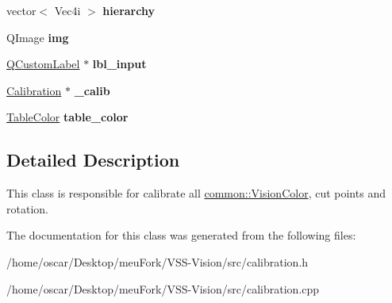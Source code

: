 \begin{DoxyCompactItemize}
\item 
\hypertarget{classcalibration_a818940843ae109ee2e7bd3cb202c4704}{vector$<$ Vec4i $>$ {\bfseries hierarchy}}\label{classcalibration_a818940843ae109ee2e7bd3cb202c4704}

\item 
\hypertarget{classcalibration_abb31447445117b52af6865628355a76a}{Q\-Image {\bfseries img}}\label{classcalibration_abb31447445117b52af6865628355a76a}

\item 
\hypertarget{classcalibration_ade63c6e2fc49e68c15514133f30cbc65}{\hyperlink{classQCustomLabel}{Q\-Custom\-Label} $\ast$ {\bfseries lbl\-\_\-input}}\label{classcalibration_ade63c6e2fc49e68c15514133f30cbc65}

\item 
\hypertarget{classcalibration_ad523b82addd861c31202b3d0d152f848}{\hyperlink{structcommon_1_1Calibration}{Calibration} $\ast$ {\bfseries \-\_\-calib}}\label{classcalibration_ad523b82addd861c31202b3d0d152f848}

\item 
\hypertarget{classcalibration_a941d98916460576b4bb2bfe9dd7c8f85}{\hyperlink{structcommon_1_1TableColor}{Table\-Color} {\bfseries table\-\_\-color}}\label{classcalibration_a941d98916460576b4bb2bfe9dd7c8f85}

\end{DoxyCompactItemize}


\subsection{Detailed Description}
This class is responsible for calibrate all \hyperlink{structcommon_1_1VisionColor}{common\-::\-Vision\-Color}, cut points and rotation. 

The documentation for this class was generated from the following files\-:\begin{DoxyCompactItemize}
\item 
/home/oscar/\-Desktop/meu\-Fork/\-V\-S\-S-\/\-Vision/src/calibration.\-h\item 
/home/oscar/\-Desktop/meu\-Fork/\-V\-S\-S-\/\-Vision/src/calibration.\-cpp\end{DoxyCompactItemize}
